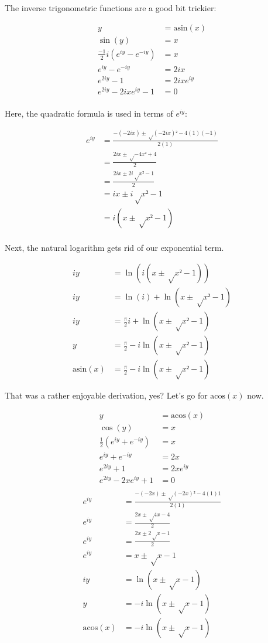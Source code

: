 \documentclass[10pt]{article}
\begin{document}
\begin{multicols}{2}
The inverse trigonometric functions are a good bit trickier:

\begin{align*}
    y &= \mathrm{asin}(x) \\
    \sin(y) &= x \\
    \frac{-1}{2}i (e^{iy} - e^{-iy}) &= x \\
    e^{iy} - e^{-iy} &= 2ix \\
    e^{2iy} - 1 &= 2ix e^{iy} \\
    e^{2iy} - 2ix e^{iy} - 1 &= 0 \\
\end{align*}

Here, the quadratic formula is used in terms of $e^{iy}$:

\begin{align*}
    e^{iy} &= \frac{ -(-2ix) ± √{(-2ix)² - 4(1)(-1)} }{2(1)} \\
    &= \frac{ 2ix ± √{-4x² + 4} }{2} \\
    &= \frac{ 2ix ± 2i √{x² - 1}}{2} \\
    &= ix ± i √{x² - 1} \\
    &= i(x ± √{x² - 1}) \\
\end{align*}

Next, the natural logarithm gets rid of our exponential term.

\begin{align*}
    iy &= \ln(i (x ± √{x² - 1})) \\
    iy &= \ln(i) + \ln(x ± √{x² - 1}) \\
    iy &= \frac{π}{2}i + \ln(x ± √{x² - 1}) \\
    y &= \frac{π}{2} - i \ln(x ± √{x² - 1}) \\
    \mathrm{asin}(x) &= \frac{π}{2} - i \ln(x ± √{x² - 1})
\end{align*}

That was a rather enjoyable derivation, yes? Let's go for $\mathrm{acos}(x)$ now.

\begin{align*}
    y &= \mathrm{acos}(x) \\
    \cos(y) &= x \\
    \frac{1}{2} (e^{iy} + e^{-iy}) &= x \\
    e^{iy} + e^{-iy} &= 2x \\
    e^{2iy} + 1 &= 2x e^{iy} \\
    e^{2iy} - 2x e^{iy} + 1 &= 0 \\
\end{align*}
\begin{align*}
    e^{iy} &= \frac{ -(-2x) ± √{(-2x)² - 4(1)1} }{2(1)} \\
    e^{iy} &= \frac{ 2x ± √{4x - 4} }{2} \\
    e^{iy} &= \frac{ 2x ± 2 √{x - 1} }{2} \\
    e^{iy} &= x ± √{x - 1} \\
    iy &= \ln(x ± √{x - 1}) \\
    y &= -i \ln(x ± √{x - 1}) \\
    \mathrm{acos}(x) &= -i \ln(x ± √{x - 1})
\end{align*}


\end{multicols}
\end{document}
